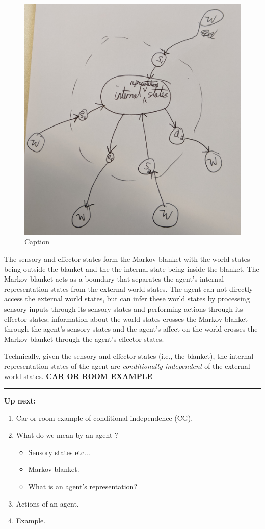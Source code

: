 \begin{figure}
    \centering
    \includegraphics[width=0.5\linewidth]{2MathematicalFramework/InitialFramework/Images/markov_blanket.jpg}
    \caption{Caption}
    \label{fig:markov_blanket}
\end{figure}

The sensory and effector states form the Markov blanket with the world states being outside the blanket and the the internal state being inside the blanket.
The Markov blanket acts as a boundary that separates the agent's internal representation states from the external world states.
The agent can not directly access the external world states, but can infer these world states by processing sensory inputs through its sensory states and performing actions through its effector states; information about the world states crosses the Markov blanket through the agent's sensory states and the agent's affect on the world crosses the Markov blanket through the agent's effector states.

Technically, given the sensory and effector states (i.e., the blanket), the internal representation states of the agent are \emph{conditionally independent} of the external world states.
\textbf{CAR OR ROOM EXAMPLE}

\noindent\rule{\textwidth}{1mm}

\textbf{Up next:}
\begin{enumerate}
    \item Car or room example of conditional independence (CG).
    \item What do we mean by an agent ?
    \begin{itemize}
        \item Sensory states etc...
        \item Markov blanket.
        \item What is an agent's representation?
    \end{itemize}
    \item Actions of an agent.
    \item Example.

\end{enumerate}

